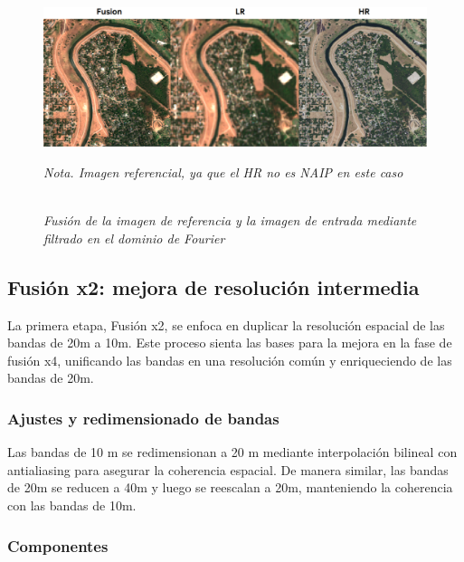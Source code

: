         \begin{figure}[H] 
            \caption{\doublespacing \\ \textit{Fusión de la imagen de referencia y la imagen de entrada mediante filtrado en el dominio de Fourier}} 
            \centering
            \includegraphics[width=1\linewidth]{images/hr_lr_fusion.png}
            \begin{justify}
                \textit{Nota. Imagen referencial, ya que el HR no es NAIP en este caso} 
            \end{justify}                    
            \label{fig:hr_lr_fusion}
        \end{figure}

    \subsection{Fusión x2: mejora de resolución intermedia}

            La primera etapa, Fusión x2, se enfoca en duplicar la resolución espacial de las bandas de 20m a 10m. Este proceso sienta las bases para la mejora en la fase de fusión x4, unificando las bandas en una resolución común y enriqueciendo de las bandas de 20m.

        \subsubsection{Ajustes y redimensionado de bandas}

            Las bandas de 10 m se redimensionan a 20 m mediante interpolación bilineal con antialiasing para asegurar la coherencia espacial. De manera similar, las bandas de 20m se reducen a 40m y luego se reescalan a 20m, manteniendo la coherencia con las bandas de 10m.


        \subsubsection{Componentes}
   
